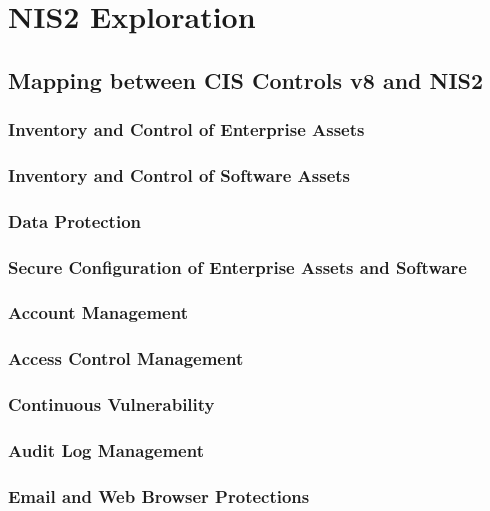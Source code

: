 %
%

\pagebreak
\section{NIS2 Exploration}

\onehalfspacing

\subsection{Mapping between CIS Controls v8 and NIS2}

\subsubsection{Inventory and Control of Enterprise Assets}

\subsubsection{Inventory and Control of Software Assets}

\subsubsection{Data Protection}

\subsubsection{Secure Configuration of Enterprise Assets and Software}

\subsubsection{Account Management}

\subsubsection{Access Control Management}

\subsubsection{Continuous Vulnerability}

\subsubsection{Audit Log Management}

\subsubsection{Email and Web Browser Protections}

